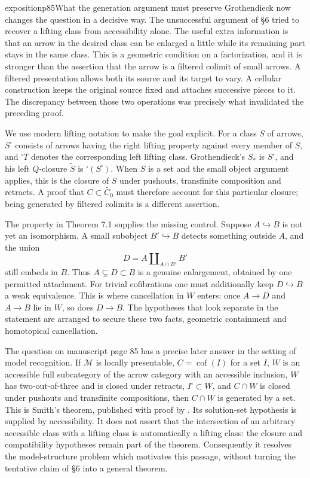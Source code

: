 \begin{dcomment}{exposition}{p85}{What the generation argument must preserve}
Grothendieck now changes the question in a decisive way. The unsuccessful argument of \S6 tried to recover a lifting class from accessibility alone. The useful extra information is that an arrow in the desired class can be enlarged a little while its remaining part stays in the same class. This is a geometric condition on a factorization, and it is stronger than the assertion that the arrow is a filtered colimit of small arrows. A filtered presentation allows both its source and its target to vary. A cellular construction keeps the original source fixed and attaches successive pieces to it. The discrepancy between those two operations was precisely what invalidated the preceding proof.

We use modern lifting notation to make the goal explicit. For a class $S$ of arrows, $S^{\square}$ consists of arrows having the right lifting property against every member of $S$, and ${}^{\square}T$ denotes the corresponding left lifting class. Grothendieck's $S_*$ is $S^{\square}$, and his left $Q$-closure $\widetilde S$ is ${}^{\square}(S^{\square})$. When $S$ is a set and the small object argument applies, this is the closure of $S$ under pushouts, transfinite composition and retracts. A proof that $C\subset\widetilde{C_0}$ must therefore account for this particular closure; being generated by filtered colimits is a different assertion.

The property in Theorem 7.1 supplies the missing control. Suppose $A\hookrightarrow B$ is not yet an isomorphism. A small subobject $B'\hookrightarrow B$ detects something outside $A$, and the union
\[
 D=A\amalg_{A\cap B'}B'
\]
still embeds in $B$. Thus $A\subsetneq D\subset B$ is a genuine enlargement, obtained by one permitted attachment. For trivial cofibrations one must additionally keep $D\hookrightarrow B$ a weak equivalence. This is where cancellation in $W$ enters: once $A\to D$ and $A\to B$ lie in $W$, so does $D\to B$. The hypotheses that look separate in the statement are arranged to secure these two facts, geometric containment and homotopical cancellation.

The question on manuscript page 85 has a precise later answer in the setting of model recognition. If $\mathcal M$ is locally presentable, $C=\operatorname{cof}(I)$ for a set $I$, $W$ is an accessible full subcategory of the arrow category with an accessible inclusion, $W$ has two-out-of-three and is closed under retracts, $I^{\square}\subset W$, and $C\cap W$ is closed under pushouts and transfinite compositions, then $C\cap W$ is generated by a set. This is Smith's theorem, published with proof by \citet[Theorem 1.7 and Lemmas 1.8--1.9]{Beke2000}. Its solution-set hypothesis is supplied by accessibility. It does not assert that the intersection of an arbitrary accessible class with a lifting class is automatically a lifting class: the closure and compatibility hypotheses remain part of the theorem. Consequently it resolves the model-structure problem which motivates this passage, without turning the tentative claim of \S6 into a general theorem.
\end{dcomment}

